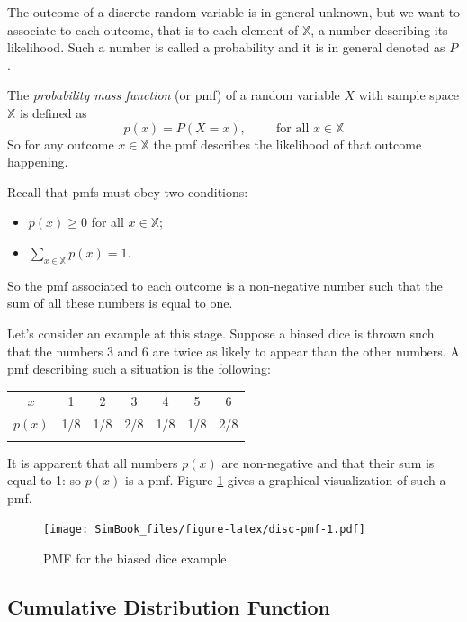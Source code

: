 \documentclass[
]{book}
\begin{document}
The outcome of a discrete random variable is in general unknown, but we want to associate to each outcome, that is to each element of \(\mathbb{X}\), a number describing its likelihood. Such a number is called a probability and it is in general denoted as \(P\).

The \emph{probability mass function} (or pmf) of a random variable \(X\) with sample space \(\mathbb{X}\) is defined as
\[
p(x)=P(X=x), \hspace{1cm} \mbox{for all } x\in\mathbb{X}
\]
So for any outcome \(x\in\mathbb{X}\) the pmf describes the likelihood of that outcome happening.

Recall that pmfs must obey two conditions:

\begin{itemize}
\item
  \(p(x)\geq 0\) for all \(x\in\mathbb{X}\);
\item
  \(\sum_{x\in\mathbb{X}}p(x)=1\).
\end{itemize}

So the pmf associated to each outcome is a non-negative number such that the sum of all these numbers is equal to one.

Let's consider an example at this stage. Suppose a biased dice is thrown such that the numbers 3 and 6 are twice as likely to appear than the other numbers. A pmf describing such a situation is the following:

\begin{longtable}[]{@{}ccccccc@{}}
\toprule
\(x\) & 1 & 2 & 3 & 4 & 5 & 6 \\ \addlinespace
\midrule
\endhead
\(p(x)\) & 1/8 & 1/8 & 2/8 & 1/8 & 1/8 & 2/8 \\ \addlinespace
\bottomrule
\end{longtable}

It is apparent that all numbers \(p(x)\) are non-negative and that their sum is equal to 1: so \(p(x)\) is a pmf. Figure \ref{fig:disc-pmf} gives a graphical visualization of such a pmf.

\begin{figure}
\centering
\texttt{[image: SimBook\_files/figure-latex/disc-pmf-1.pdf]}
\caption{\label{fig:disc-pmf}PMF for the biased dice example}
\end{figure}

\hypertarget{cumulative-distribution-function}{%
\subsection{Cumulative Distribution Function}\label{cumulative-distribution-function}}
\end{document}
